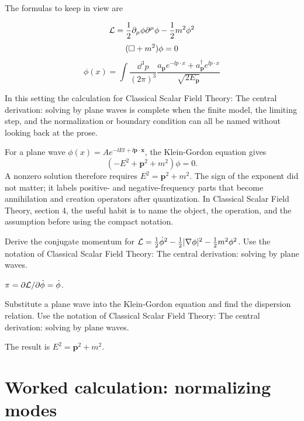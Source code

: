 The formulas to keep in view are

\[
  \mathcal L=\frac12\partial_\mu\phi\partial^\mu\phi-\frac12m^2\phi^2
\]
\[
  (\Box+m^2)\phi=0
\]
\[
  \phi(x)=\int\frac{\dd^3p}{(2\pi)^3}\frac{a_{\bm p}e^{-\ii p\cdot x}+a_{\bm p}^\dagger e^{\ii p\cdot x}}{\sqrt{2E_{\bm p}}}
\]

In this setting the calculation for Classical Scalar Field Theory: The central derivation: solving by plane waves is complete when the finite model, the limiting step, and the normalization or boundary condition can all be named without looking back at the prose.




\begin{example}
For a plane wave \(\phi(x)=Ae^{-\ii Et+\ii\bm p\cdot\bm x}\), the Klein-Gordon equation gives
\[
  (-E^2+\bm p^2+m^2)\phi=0.
\]
A nonzero solution therefore requires \(E^2=\bm p^2+m^2\).  The sign of the exponent did not matter; it labels positive- and negative-frequency parts that become annihilation and creation operators after quantization.  In Classical Scalar Field Theory, section 4, the useful habit is to name the object, the operation, and the assumption before using the compact notation.
\end{example}



\begin{exercise}
Derive the conjugate momentum for \(\mathcal L=\frac12\dot\phi^2-\frac12|\nabla\phi|^2-\frac12m^2\phi^2\).  Use the notation of Classical Scalar Field Theory: The central derivation: solving by plane waves.
\begin{answer}
\(\pi=\partial\mathcal L/\partial\dot\phi=\dot\phi\).
\end{answer}
\end{exercise}

\begin{exercise}
Substitute a plane wave into the Klein-Gordon equation and find the dispersion relation.  Use the notation of Classical Scalar Field Theory: The central derivation: solving by plane waves.
\begin{answer}
The result is \(E^2=\bm p^2+m^2\).
\end{answer}
\end{exercise}



\section{Worked calculation: normalizing modes}

